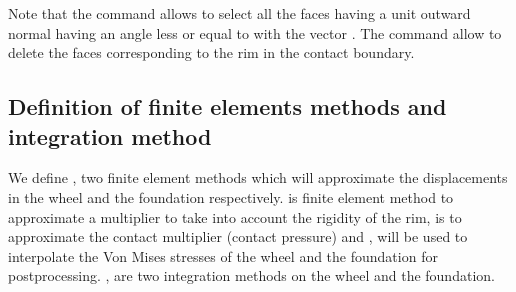 \documentclass[a4paper,11pt,english]{sphinxmanual}
\begin{document}
Note that the command  allows to select all the faces having a unit outward normal having an angle less or equal to  with the vector \sphinxtitleref{{[}0., \sphinxhyphen{}1.{]}}. The command  allow to delete the faces corresponding to the rim in the contact boundary.


\subsection{Definition of finite elements methods and integration method}
\label{\detokenize{tutorial/wheel:definition-of-finite-elements-methods-and-integration-method}}
We define ,  two finite element methods which will approximate the displacements in the wheel and the foundation respectively.  is  finite element method to approximate a multiplier to take into account the rigidity of the rim,  is to approximate the contact multiplier (contact pressure) and ,  will be used to interpolate the Von Mises stresses of the wheel and the foundation for post\sphinxhyphen{}processing. ,  are two integration methods on the  wheel and the foundation.
\end{document}
